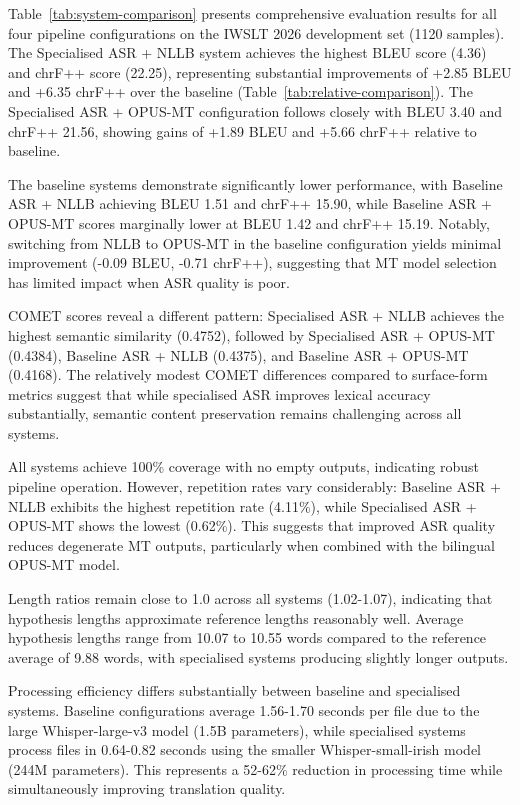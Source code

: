 \documentclass[11pt]{article}
\begin{document}
Table~\ref{tab:system-comparison} presents comprehensive evaluation results for all four pipeline configurations on the IWSLT 2026 development set (1120 samples). The Specialised ASR + NLLB system achieves the highest BLEU score (4.36) and chrF++ score (22.25), representing substantial improvements of +2.85 BLEU and +6.35 chrF++ over the baseline (Table~\ref{tab:relative-comparison}). The Specialised ASR + OPUS-MT configuration follows closely with BLEU 3.40 and chrF++ 21.56, showing gains of +1.89 BLEU and +5.66 chrF++ relative to baseline.

The baseline systems demonstrate significantly lower performance, with Baseline ASR + NLLB achieving BLEU 1.51 and chrF++ 15.90, while Baseline ASR + OPUS-MT scores marginally lower at BLEU 1.42 and chrF++ 15.19. Notably, switching from NLLB to OPUS-MT in the baseline configuration yields minimal improvement (-0.09 BLEU, -0.71 chrF++), suggesting that MT model selection has limited impact when ASR quality is poor.

COMET scores reveal a different pattern: Specialised ASR + NLLB achieves the highest semantic similarity (0.4752), followed by Specialised ASR + OPUS-MT (0.4384), Baseline ASR + NLLB (0.4375), and Baseline ASR + OPUS-MT (0.4168). The relatively modest COMET differences compared to surface-form metrics suggest that while specialised ASR improves lexical accuracy substantially, semantic content preservation remains challenging across all systems.

All systems achieve 100\% coverage with no empty outputs, indicating robust pipeline operation. However, repetition rates vary considerably: Baseline ASR + NLLB exhibits the highest repetition rate (4.11\%), while Specialised ASR + OPUS-MT shows the lowest (0.62\%). This suggests that improved ASR quality reduces degenerate MT outputs, particularly when combined with the bilingual OPUS-MT model.

Length ratios remain close to 1.0 across all systems (1.02-1.07), indicating that hypothesis lengths approximate reference lengths reasonably well. Average hypothesis lengths range from 10.07 to 10.55 words compared to the reference average of 9.88 words, with specialised systems producing slightly longer outputs.

Processing efficiency differs substantially between baseline and specialised systems. Baseline configurations average 1.56-1.70 seconds per file due to the large Whisper-large-v3 model (1.5B parameters), while specialised systems process files in 0.64-0.82 seconds using the smaller Whisper-small-irish model (244M parameters). This represents a 52-62\% reduction in processing time while simultaneously improving translation quality.
\end{document}
